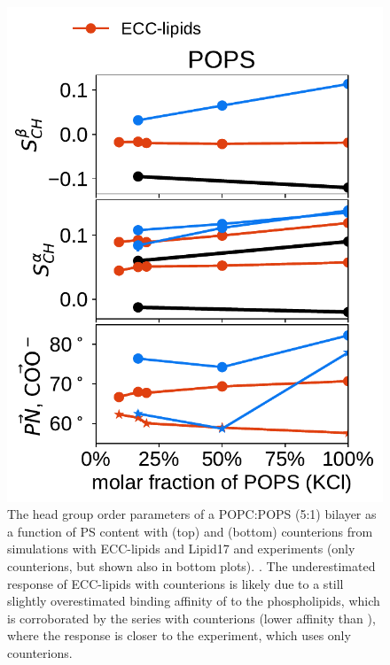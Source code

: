 \documentclass[journal=jpcbfk,manuscript=article]{achemso}
\newlength{\figheightsmall}
\newlength{\figheight}
\begin{document}
\begin{figure}[!tbp]
  \includegraphics[height=\figheightsmall]{../Fig/order_parameters_changes_A-B_PC-PS_mix_POPS_kcl.pdf} 
  \caption{\label{fig:delta_ordPar_NaCl_PC-PS_mix} 
    The head group order parameters of a POPC:POPS (5:1) bilayer as a function of PS content
    with  (top) and  (bottom) counterions from simulations with ECC-lipids and Lipid17 \cite{lipid17-future} 
    and experiments (only  counterions, but shown also in bottom plots). \cite{roux90}. 
    The underestimated response of ECC-lipids with  counterions 
    is likely due to a still slightly overestimated binding affinity of  to the phospholipids,
    which is corroborated by the series with  counterions (lower affinity than ),
    where the response is closer to the experiment, which uses only  counterions. 
  }
\end{figure} 
\end{document}
